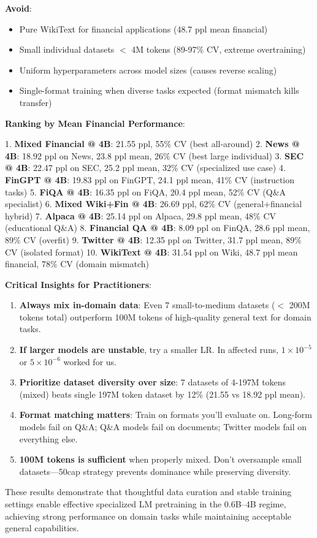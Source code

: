 \textbf{Avoid}:
\begin{itemize}
\item Pure WikiText for financial applications (48.7 ppl mean financial)
\item Small individual datasets $<$ 4M tokens (89-97\% CV, extreme overtraining)
\item Uniform hyperparameters across model sizes (causes reverse scaling)
\item Single-format training when diverse tasks expected (format mismatch kills transfer)
\end{itemize}

\textbf{Ranking by Mean Financial Performance}:

1. \textbf{Mixed Financial @ 4B}: 21.55 ppl, 55\% CV (best all-around)
2. \textbf{News @ 4B}: 18.92 ppl on News, 23.8 ppl mean, 26\% CV (best large individual)
3. \textbf{SEC @ 4B}: 22.47 ppl on SEC, 25.2 ppl mean, 32\% CV (specialized use case)
4. \textbf{FinGPT @ 4B}: 19.83 ppl on FinGPT, 24.1 ppl mean, 41\% CV (instruction tasks)
5. \textbf{FiQA @ 4B}: 16.35 ppl on FiQA, 20.4 ppl mean, 52\% CV (Q\&A specialist)
6. \textbf{Mixed Wiki+Fin @ 4B}: 26.69 ppl, 62\% CV (general+financial hybrid)
7. \textbf{Alpaca @ 4B}: 25.14 ppl on Alpaca, 29.8 ppl mean, 48\% CV (educational Q\&A)
8. \textbf{Financial QA @ 4B}: 8.09 ppl on FinQA, 28.6 ppl mean, 89\% CV (overfit)
9. \textbf{Twitter @ 4B}: 12.35 ppl on Twitter, 31.7 ppl mean, 89\% CV (isolated format)
10. \textbf{WikiText @ 4B}: 31.54 ppl on Wiki, 48.7 ppl mean financial, 78\% CV (domain mismatch)

\textbf{Critical Insights for Practitioners}:

\begin{enumerate}
\item \textbf{Always mix in-domain data}: Even 7 small-to-medium datasets ($<$ 200M tokens total) outperform 100M tokens of high-quality general text for domain tasks.
\item \textbf{If larger models are unstable}, try a smaller LR. In affected runs, $1\times10^{-5}$ or $5\times10^{-6}$ worked for us.
\item \textbf{Prioritize dataset diversity over size}: 7 datasets of 4-197M tokens (mixed) beats single 197M token dataset by 12\% (21.55 vs 18.92 ppl mean).
\item \textbf{Format matching matters}: Train on formats you'll evaluate on. Long-form models fail on Q\&A; Q\&A models fail on documents; Twitter models fail on everything else.
\item \textbf{100M tokens is sufficient} when properly mixed. Don't oversample small datasets—50cap strategy prevents dominance while preserving diversity.
\end{enumerate}

These results demonstrate that thoughtful data curation and stable training settings enable effective specialized LM pretraining in the 0.6B–4B regime, achieving strong performance on domain tasks while maintaining acceptable general capabilities.
